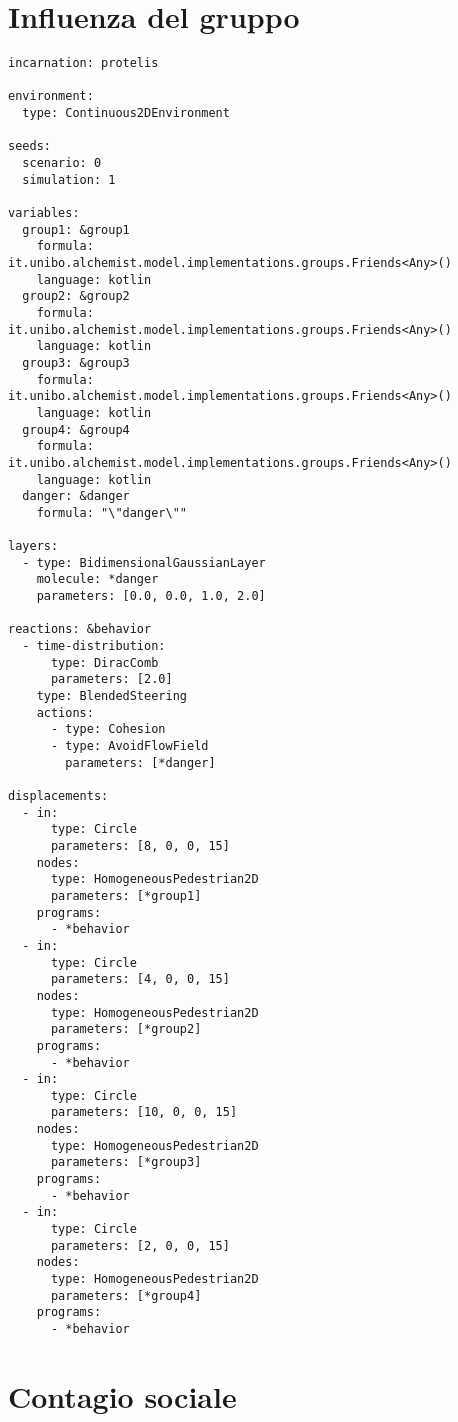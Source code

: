 \section{Influenza del gruppo}

\begin{verbatim}
incarnation: protelis

environment:
  type: Continuous2DEnvironment

seeds:
  scenario: 0
  simulation: 1

variables:
  group1: &group1
    formula: it.unibo.alchemist.model.implementations.groups.Friends<Any>()
    language: kotlin
  group2: &group2
    formula: it.unibo.alchemist.model.implementations.groups.Friends<Any>()
    language: kotlin
  group3: &group3
    formula: it.unibo.alchemist.model.implementations.groups.Friends<Any>()
    language: kotlin
  group4: &group4
    formula: it.unibo.alchemist.model.implementations.groups.Friends<Any>()
    language: kotlin
  danger: &danger
    formula: "\"danger\""

layers:
  - type: BidimensionalGaussianLayer
    molecule: *danger
    parameters: [0.0, 0.0, 1.0, 2.0]

reactions: &behavior
  - time-distribution:
      type: DiracComb
      parameters: [2.0]
    type: BlendedSteering
    actions:
      - type: Cohesion
      - type: AvoidFlowField
        parameters: [*danger]

displacements:
  - in:
      type: Circle
      parameters: [8, 0, 0, 15]
    nodes:
      type: HomogeneousPedestrian2D
      parameters: [*group1]
    programs:
      - *behavior
  - in:
      type: Circle
      parameters: [4, 0, 0, 15]
    nodes:
      type: HomogeneousPedestrian2D
      parameters: [*group2]
    programs:
      - *behavior
  - in:
      type: Circle
      parameters: [10, 0, 0, 15]
    nodes:
      type: HomogeneousPedestrian2D
      parameters: [*group3]
    programs:
      - *behavior
  - in:
      type: Circle
      parameters: [2, 0, 0, 15]
    nodes:
      type: HomogeneousPedestrian2D
      parameters: [*group4]
    programs:
      - *behavior
\end{verbatim}

\section{Contagio sociale}

